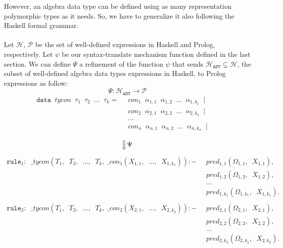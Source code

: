 \documentclass{report}
\theoremstyle{definition}
\theoremstyle{definition}
\newcommand{\ttt}[1]{\texttt{#1}}
\newcommand{\tav}{\;\;}
\newcommand{\SLongdownarrow}{\mathrel{\rotatebox[origin=c]{-90}{$\Longrightarrow$}}}
\begin{document}
	However, an algebra data type can be defined using as many representation polymorphic types as it needs. So, we have to generalize it also following the Haskell formal grammar.\\\\
	Let $\mathcal{H}$, $\mathcal{P}$ be the set of well-defined expressions in Haskell and Prolog, respectively. Let $\psi$ be our syntax-translate mechanism function defined in the last section. We can define $\Psi$ a refinement of the function $\psi$ that sends $\mathcal{H}_{\ttt{ADT}} \subsetneq \mathcal{H}$, the subset of well-defined algebra data types expressions in Haskell, to Prolog expressions as follow: $$\Psi: \mathcal{H}_{\ttt{ADT}} \longrightarrow \mathcal{P} $$
	\begin{align*}
		\ttt{data} \tav tycon \tav \tau_1 \tav \tau_2 \tav \ldots \tav \tau_k 	= & \tav con_1 \tav \alpha_{1,1} \tav \alpha_{1,2} \tav \ldots \tav \alpha_{1,k_1} \tav | &   &   \\
		                                                                         & \tav con_2 \tav \alpha_{2,1} \tav \alpha_{2,2} \tav \ldots \tav \alpha_{2,k_2} \tav | &   &   \\
		                                                                         & \tav \ldots \tav                                                                      &   &   \\
		                                                                         & \tav con_n \tav \alpha_{n,1} \tav \alpha_{n,2} \tav \ldots \tav \alpha_{n,k_n} \tav | &   &   \\
	\end{align*}
	$$\SLongdownarrow \Psi$$
	\begin{align*}
		\ttt{rule}_1: \tav \_ tycon (T_1, \tav T_2, \tav \ldots, \tav T_k, \; \_ con_1(X_{1,1}, \tav \ldots, \tav X_{1,k_1})) :-&
		\tav pred_{1, 1}(\Omega_{1,1}, \tav X_{1,1}), && \\
		  & \tav pred_{1, 2}(\Omega_{1,2}, \tav X_{1,2}),       &   &   \\
		  & \tav \ldots \tav                                    &   &   \\
		  & \tav pred_{1, k_1}(\Omega_{1,k_1}, \tav X_{1,k_1}). &   &   \\
		\\
		\ttt{rule}_2: \tav \_ tycon (T_1, \tav T_2, \tav \ldots, \tav T_k, \; \_ con_2(X_{2,1}, \tav \ldots, \tav X_{2,k_2})) :-&
		\tav pred_{2, 1}(\Omega_{2,1}, \tav X_{2,1}), && \\
		  & \tav pred_{2, 2}(\Omega_{2,2}, \tav X_{2,2}),       &   &   \\
		  & \tav \ldots \tav                                    &   &   \\
		  & \tav pred_{2, k_2}(\Omega_{2,k_2}, \tav X_{2,k_2}). &   &   
	\end{align*}
\end{document}
